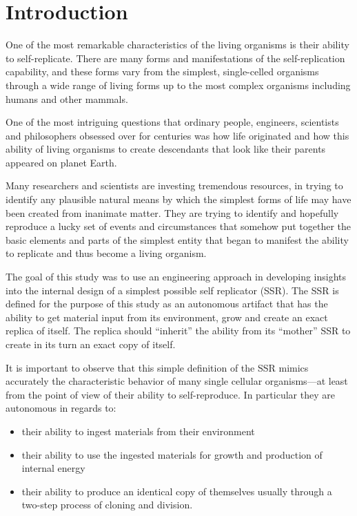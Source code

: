 \section{Introduction}

One of the most remarkable characteristics of the living organisms is
their ability to self-replicate. There are many forms and
manifestations of the self-replication capability, and these forms vary
from the simplest, single-celled organisms through a wide range of
living forms up to the most complex organisms including humans and
other mammals.

One of the most intriguing questions that ordinary people, engineers,
scientists and philosophers obsessed over for centuries was how life
originated and how this ability of living organisms to create
descendants that look like their parents appeared on planet Earth. 

Many researchers and scientists
are investing tremendous resources, in trying to identify any plausible
natural means by which the simplest forms of life may have been created
from inanimate matter. They are trying to identify and hopefully
reproduce a lucky set of events and circumstances that somehow put
together the basic elements and parts of the simplest entity that began
to manifest the ability to replicate and thus become a living organism.

The goal of this study was to use an engineering approach in developing
insights into the internal design of a simplest possible self
replicator (SSR). The SSR is defined for the purpose of this study as
an autonomous artifact that has the ability to get material input from
its environment, grow and create an exact replica of itself. The
replica should ``inherit'' the ability from its ``mother'' SSR to create in
its turn an exact copy of itself.

It is important to observe that this simple definition of the SSR mimics
accurately the characteristic behavior of many single cellular
organisms---at least from the point of view of their ability to
self-reproduce. In particular they are autonomous in regards to:

\begin{itemize}
\item their ability to ingest materials from their environment
\item their ability to use the ingested materials for growth and
production of internal energy
\item their ability to produce an identical copy of themselves usually
through a two-step process of cloning and division.
\end{itemize}

